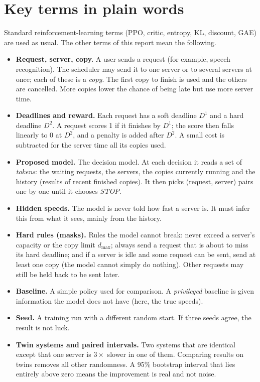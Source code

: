 \documentclass[10pt,a4paper]{article}
\begin{document}
\section{Key terms in plain words}\label{sec:terms}
Standard reinforcement-learning terms (PPO, critic, entropy, KL, discount, GAE) are used as usual. The other terms of
this report mean the following.
\begin{itemize}
\item \textbf{Request, server, copy.} A user sends a request (for example, speech recognition). The scheduler may send it to one server or to several servers at once; each of these is a \emph{copy}. The first copy to finish is used and the others are cancelled. More copies lower the chance of being late but use more server time.
\item \textbf{Deadlines and reward.} Each request has a soft deadline $D^1$ and a hard deadline $D^2$. A request scores 1 if it finishes by $D^1$; the score then falls linearly to 0 at $D^2$, and a penalty is added after $D^2$. A small cost is subtracted for the server time all its copies used.
\item \textbf{Proposed model.} The decision model. At each decision it reads a set of \emph{tokens}: the waiting requests, the servers, the copies currently running and the history (results of recent finished copies). It then picks (request, server) pairs one by one until it chooses \emph{STOP}.
\item \textbf{Hidden speeds.} The model is never told how fast a server is. It must infer this from what it sees, mainly from the history.
\item \textbf{Hard rules (masks).} Rules the model cannot break: never exceed a server's capacity or the copy limit $d_{\max}$; always send a request that is about to miss its hard deadline; and if a server is idle and some request can be sent, send at least one copy (the model cannot simply do nothing). Other requests may still be held back to be sent later.
\item \textbf{Baseline.} A simple policy used for comparison. A \emph{privileged} baseline is given information the model does not have (here, the true speeds).
\item \textbf{Seed.} A training run with a different random start. If three seeds agree, the result is not luck.
\item \textbf{Twin systems and paired intervals.} Two systems that are identical except that one server is $3\times$ slower in one of them. Comparing results on twins removes all other randomness. A 95\% bootstrap interval that lies entirely above zero means the improvement is real and not noise.

\end{itemize}
\end{document}
